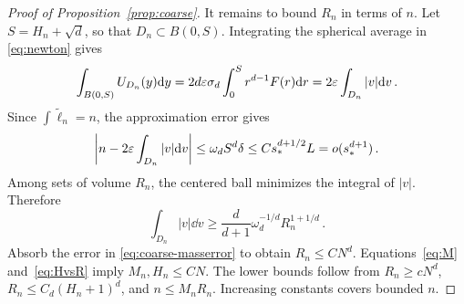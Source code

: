 \begin{proof}[Proof of Proposition~\ref{prop:coarse}]
It remains to bound $R_n$ in terms of $n$.
Let $S=H_n+\sqrt d$, so that $D_n\subset B(0,S)$.
Integrating the spherical average in \eqref{eq:newton} gives
\begin{equation}\label{eq:massidentity}
\int_{B(0,S)}U_{D_n}(y)\mathrm d y
=2d\varepsilon\sigma_d\int_0^S r^{d-1}F(r)\mathrm d r
=2\varepsilon\int_{D_n}|v|\mathrm d v\, .
\end{equation}
Since $\int\widetilde\ell_n=n$, the approximation error gives
\begin{equation}\label{eq:coarse-masserror}
\left|n-2\varepsilon\int_{D_n}|v|\mathrm d v\right|
\leq\omega_dS^d\delta\leq Cs_*^{d+1/2}L=o(s_*^{d+1})\, .
\end{equation}
Among sets of volume $R_n$, the centered ball minimizes the integral
of $|v|$. Therefore
\begin{equation}\label{eq:radial-packing}
\int_{D_n}|v|\dd v\geq
\frac d{d+1}\omega_d^{-1/d}R_n^{1+1/d}\, .
\end{equation}
Absorb the error in \eqref{eq:coarse-masserror} to obtain $R_n\leq CN^d$.
Equations~\eqref{eq:M} and~\eqref{eq:HvsR} imply $M_n,H_n\leq CN$.
The lower bounds follow from $R_n\geq cN^d$,
$R_n\leq C_d(H_n+1)^d$, and $n\leq M_nR_n$.
Increasing constants covers bounded $n$.
\end{proof}
